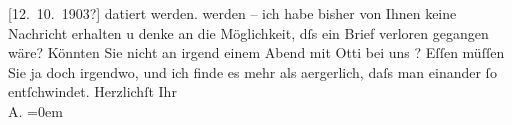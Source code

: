 \begin{ledgroupsized}[t]{13cm}
{{{                     [12. 10. 1903?] datiert
                  werden.}}}\label{K_L02986-1h} werden – ich habe bisher von Ihnen keine Nachricht erhalten u denke
               an die Möglichkeit, dſs ein {\pb}Brief verloren
               gegangen wäre?\pend
           \pstart
           Könnten Sie nicht an irgend einem Abend mit Otti bei uns \label{K_L02986-2v}\label{K_L02986-2h}?
               Eſſen müſſen Sie ja doch irgendwo, und ich finde es mehr als aergerlich, {\pb}daſs man einander ſo entſchwindet.\pend
           \pstart
           Herzlichſt Ihr {\\[\baselineskip]}\spacefill\mbox{A.}\pend
           \leftskip=0em{}
         
         \endnumbering{}\end{ledgroupsized}  \newcommand{\dateiname}{L02986}\newcommand{\titel}{Arthur Schnitzler an Felix Salten, [12. 10. 1903?]}\newcommand{\editorInnen}{Martin Anton Müller und Laura Untner}
      